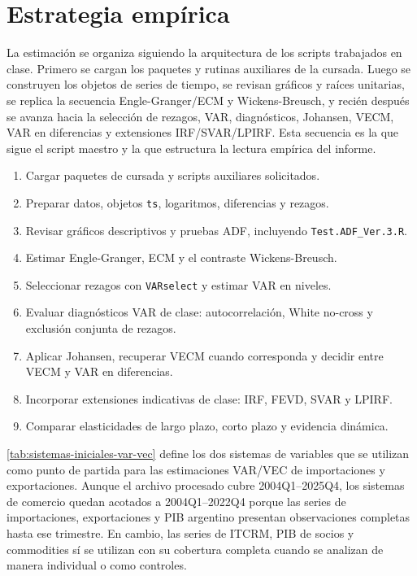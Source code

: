 \documentclass[11pt,a4paper]{article}
\begin{document}
	\section{Estrategia empírica}
	\label{sec:estrategia-empirica}
	
	La estimación se organiza siguiendo la arquitectura de los scripts trabajados
	en clase. Primero se cargan los paquetes y rutinas auxiliares de la cursada.
	Luego se construyen los objetos de series de tiempo, se revisan gráficos y
	raíces unitarias, se replica la secuencia Engle-Granger/ECM y Wickens-Breusch,
	y recién después se avanza hacia la selección de rezagos, VAR, diagnósticos,
	Johansen, VECM, VAR en diferencias y extensiones IRF/SVAR/LPIRF. Esta secuencia
	es la que sigue el script maestro y la que estructura la lectura empírica del
	informe.
	
	\begin{enumerate}
		\item Cargar paquetes de cursada y scripts auxiliares solicitados.
		\item Preparar datos, objetos \texttt{ts}, logaritmos, diferencias y rezagos.
		\item Revisar gráficos descriptivos y pruebas ADF, incluyendo
		\texttt{Test.ADF\_Ver.3.R}.
		\item Estimar Engle-Granger, ECM y el contraste Wickens-Breusch.
		\item Seleccionar rezagos con \texttt{VARselect} y estimar VAR en niveles.
		\item Evaluar diagnósticos VAR de clase: autocorrelación, White no-cross y
		exclusión conjunta de rezagos.
		\item Aplicar Johansen, recuperar VECM cuando corresponda y decidir entre
		VECM y VAR en diferencias.
		\item Incorporar extensiones indicativas de clase: IRF, FEVD, SVAR y LPIRF.
		\item Comparar elasticidades de largo plazo, corto plazo y evidencia dinámica.
	\end{enumerate}
	
	\autoref{tab:sistemas-iniciales-var-vec} define los dos sistemas de variables
	que se utilizan como punto de partida para las estimaciones VAR/VEC de
	importaciones y exportaciones. Aunque el archivo procesado cubre 2004Q1--2025Q4,
	los sistemas de comercio quedan acotados a 2004Q1--2022Q4 porque las series de
	importaciones, exportaciones y PIB argentino presentan observaciones completas
	hasta ese trimestre. En cambio, las series de ITCRM, PIB de socios y commodities
	sí se utilizan con su cobertura completa cuando se analizan de manera individual
	o como controles.
	
\end{document}
